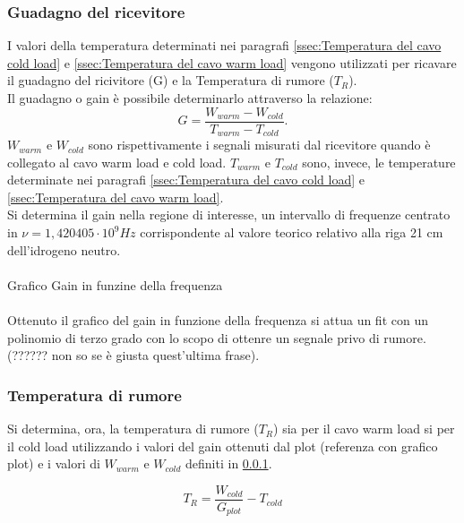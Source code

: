 \subsubsection{Guadagno del ricevitore}
\label{ssec:Guadagno del ricevitore}
I valori della temperatura determinati nei paragrafi \ref{ssec:Temperatura del cavo cold load} e  \ref{ssec:Temperatura del cavo warm load}  vengono utilizzati per ricavare il guadagno del ricivitore (G) e la Temperatura di rumore ($T_{R}$).\\
Il guadagno o gain è possibile determinarlo attraverso la relazione:
\begin{equation}
G = \dfrac{W_{warm}-W_{cold}}{T_{warm}-T_{cold}}.
\label{Formula gain}
\end{equation}
$W_{warm}$ e $W_{cold}$ sono rispettivamente i segnali misurati dal ricevitore quando è collegato al cavo warm load e cold load.
$T_{warm}$ e $T_{cold}$ sono, invece, le temperature determinate nei paragrafi \ref{ssec:Temperatura del cavo cold load} e  \ref{ssec:Temperatura del cavo warm load}.\\
Si determina il gain nella regione di interesse, un intervallo di frequenze centrato in $\nu = 1,420405 \cdot  10^{9} Hz$ corrispondente al valore teorico relativo alla riga 21 cm dell'idrogeno neutro.
\\\\
Grafico Gain in funzine della frequenza
\\\\
Ottenuto il grafico del gain in funzione della frequenza si attua un fit con un polinomio di terzo grado con lo scopo di ottenre un segnale privo di rumore. (?????? non so se è giusta quest'ultima frase).

\subsubsection{Temperatura di rumore}
Si determina, ora, la temperatura di rumore ($T_{R}$) sia per il cavo warm load si per il cold load utilizzando i valori del gain ottenuti dal plot (referenza con grafico plot) e i valori di $W_{warm}$ e $W_{cold}$ definiti in \ref{ssec:Guadagno del ricevitore}.
 
\begin{equation}
T_{R} = \dfrac{W_{cold}}{G_{plot}}-T_{cold}
\label{Temperatura rumore cold}
\end{equation}

